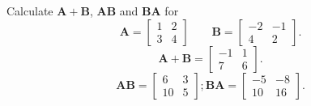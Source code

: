 Calculate $\mathbf{A} + \mathbf{B}$, $\mathbf{AB}$ and $\mathbf{BA}$ for
\[
\mathbf{A} = \begin{bmatrix} 1 & 2\\ 3 & 4 \end{bmatrix} \quad \quad \mathbf{B} = \begin{bmatrix} -2 & -1 \\ 4 & 2 \end{bmatrix}.
\]
\newline
\[
\mathbf{A} + \mathbf{B} = \begin{bmatrix}
-1 & 1\\
7 & 6
\end{bmatrix}.
\]
\[
\mathbf{AB} = \begin{bmatrix}
6 & 3\\
10 & 5
\end{bmatrix}; \mathbf{BA} = \begin{bmatrix}
-5 & -8\\
10 & 16
\end{bmatrix}.
\]